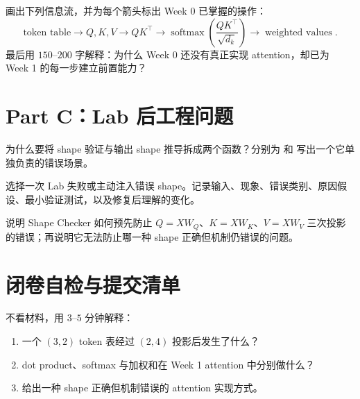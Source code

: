 \documentclass[11pt,a4paper]{article}
\begin{document}
画出下列信息流，并为每个箭头标出 Week 0 已掌握的操作：
\[
\text{token table}
\rightarrow Q,K,V
\rightarrow QK^\top
\rightarrow \operatorname{softmax}\!\left(\frac{QK^\top}{\sqrt{d_k}}\right)
\rightarrow \operatorname{weighted\ values}.
\]
最后用 $150$--$200$ 字解释：为什么 Week 0 还没有真正实现 attention，却已为 Week 1 的每一步建立前置能力？
\AnswerSpace{45mm}

\section{Part C：Lab 后工程问题}

为什么要将 shape 验证与输出 shape 推导拆成两个函数？分别为  和  写出一个它单独负责的错误场景。
\AnswerSpace{25mm}

选择一次 Lab 失败或主动注入错误 shape。记录输入、现象、错误类别、原因假设、最小验证测试，以及修复后理解的变化。
\AnswerSpace{32mm}

说明 Shape Checker 如何预先防止 $Q=XW_Q$、$K=XW_K$、$V=XW_V$ 三次投影的错误；再说明它无法防止哪一种 shape 正确但机制仍错误的问题。
\AnswerSpace{28mm}

\section{闭卷自检与提交清单}
不看材料，用 $3$--$5$ 分钟解释：
\begin{enumerate}[label=(\arabic*)]
\item 一个 $(3,2)$ token 表经过 $(2,4)$ 投影后发生了什么？
\item dot product、softmax 与加权和在 Week 1 attention 中分别做什么？
\item 给出一种 shape 正确但机制错误的 attention 实现方式。
\end{enumerate}

\begin{itemize}[leftmargin=8mm]
\end{itemize}
\end{document}
